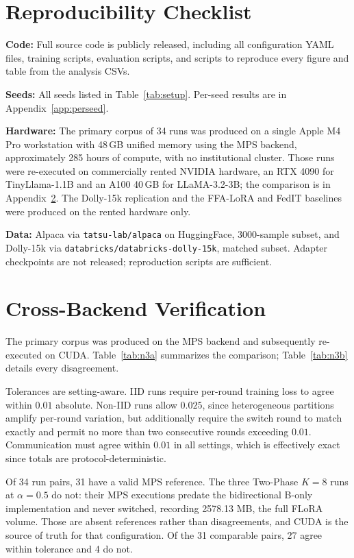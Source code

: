 \section{Reproducibility Checklist}
\label{app:repro}
\textbf{Code:} Full source code is publicly released, including all configuration YAML files, training scripts, evaluation scripts, and scripts to reproduce every figure and table from the analysis CSVs.

\textbf{Seeds:} All seeds listed in Table~\ref{tab:setup}. Per-seed results are in Appendix~\ref{app:perseed}.

\textbf{Hardware:} The primary corpus of 34 runs was produced on a single Apple M4 Pro workstation with 48\,GB unified memory using the MPS backend, approximately 285 hours of compute, with no institutional cluster. Those runs were re-executed on commercially rented NVIDIA hardware, an RTX 4090 for TinyLlama-1.1B and an A100 40\,GB for LLaMA-3.2-3B; the comparison is in Appendix~\ref{app:crossbackend}. The Dolly-15k replication and the FFA-LoRA and FedIT baselines were produced on the rented hardware only.

\textbf{Data:} Alpaca \citep{taori2023alpaca} via \texttt{tatsu-lab/alpaca} on HuggingFace, 3000-sample subset, and Dolly-15k \citep{dolly2023} via \texttt{databricks/databricks-dolly-15k}, matched subset. Adapter checkpoints are not released; reproduction scripts are sufficient.

\section{Cross-Backend Verification}
\label{app:crossbackend}

The primary corpus was produced on the MPS backend and subsequently re-executed on CUDA. Table~\ref{tab:n3a} summarizes the comparison; Table~\ref{tab:n3b} details every disagreement.

Tolerances are setting-aware. IID runs require per-round training loss to agree within $0.01$ absolute. Non-IID runs allow $0.025$, since heterogeneous partitions amplify per-round variation, but additionally require the switch round to match exactly and permit no more than two consecutive rounds exceeding $0.01$. Communication must agree within $0.01$ in all settings, which is effectively exact since totals are protocol-deterministic.

Of 34 run pairs, 31 have a valid MPS reference. The three Two-Phase $K{=}8$ runs at $\alpha{=}0.5$ do not: their MPS executions predate the bidirectional B-only implementation and never switched, recording 2578.13 MB, the full FLoRA volume. Those are absent references rather than disagreements, and CUDA is the source of truth for that configuration. Of the 31 comparable pairs, 27 agree within tolerance and 4 do not.

